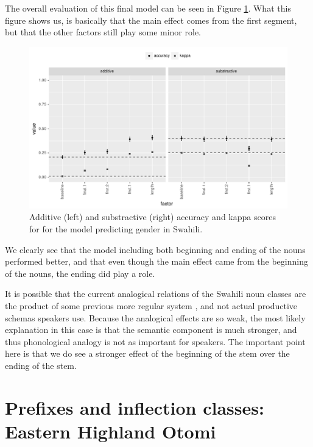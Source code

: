 The overall evaluation of this final model can be seen in Figure  \ref{fig:overall-fi-class-sg-swahili}. What this figure shows us, is basically that the main effect comes from the first segment, but that the other factors still play some minor role.

\begin{figure}[!htpb]
  \centering
  \includegraphics[width=1.0\textwidth]{./figures/swahili/p-fi-overall.pdf}
    \caption{Additive (left) and substractive (right) accuracy and kappa scores for for the model predicting gender in Swahili.}\label{fig:overall-fi-class-sg-swahili}
\end{figure}

We clearly see that the model including both beginning and ending of the nouns performed better, and that even though the main effect came from the beginning of the nouns, the ending did play a role.

It is possible that the current analogical relations of the Swahili noun classes are the product of some previous more regular system \autocite{Nurse.1993}, and not actual productive schemas speakers use. Because the analogical effects are so weak, the most likely explanation in this case is that the semantic component is much stronger, and thus phonological analogy is not as important for speakers. The important point here is that we do see a stronger effect of the beginning of the stem over the ending of the stem.


\section{Prefixes and inflection classes: Eastern Highland Otomi}

